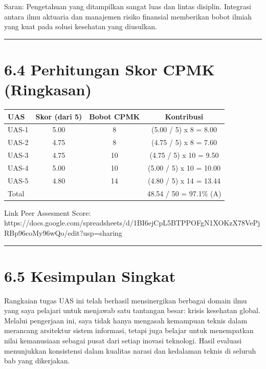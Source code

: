 \documentclass[
  letterpaper,
  DIV=11,
  numbers=noendperiod]{scrreprt}
\begin{document}
Saran: Pengetahuan yang ditampilkan sangat luas dan lintas disiplin.
Integrasi antara ilmu aktuaria dan manajemen risiko finansial memberikan
bobot ilmiah yang kuat pada solusi kesehatan yang diusulkan.

\begin{center}\rule{0.5\linewidth}{0.5pt}\end{center}

\section{6.4 Perhitungan Skor CPMK
(Ringkasan)}\label{perhitungan-skor-cpmk-ringkasan-1}

\begin{longtable}[]{@{}lccc@{}}
\toprule\noalign{}
UAS & Skor (dari 5) & Bobot CPMK & Kontribusi \\
\midrule\noalign{}
\endhead
\bottomrule\noalign{}
\endlastfoot
UAS-1 & 5.00 & 8 & (5.00 / 5) x 8 = 8.00 \\
UAS-2 & 4.75 & 8 & (4.75 / 5) x 8 = 7.60 \\
UAS-3 & 4.75 & 10 & (4.75 / 5) x 10 = 9.50 \\
UAS-4 & 5.00 & 10 & (5.00 / 5) x 10 = 10.00 \\
UAS-5 & 4.80 & 14 & (4.80 / 5) x 14 = 13.44 \\
Total & & & 48.54 / 50 = 97.1\% (A) \\
\end{longtable}

Link Peer Assesment Score:
https://docs.google.com/spreadsheets/d/1BI6ejCpL5BTPPOFgN1XOKzX78VePjRBp96coMy96wQo/edit?usp=sharing

\begin{center}\rule{0.5\linewidth}{0.5pt}\end{center}

\section{6.5 Kesimpulan Singkat}\label{kesimpulan-singkat-1}

Rangkaian tugas UAS ini telah berhasil mensinergikan berbagai domain
ilmu yang saya pelajari untuk menjawab satu tantangan besar: krisis
kesehatan global. Melalui pengerjaan ini, saya tidak hanya mengasah
kemampuan teknis dalam merancang arsitektur sistem informasi, tetapi
juga belajar untuk menempatkan nilai kemanusiaan sebagai pusat dari
setiap inovasi teknologi. Hasil evaluasi menunjukkan konsistensi dalam
kualitas narasi dan kedalaman teknis di seluruh bab yang dikerjakan.
\end{document}

